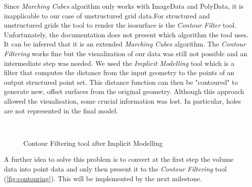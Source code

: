 Since \textit{Marching Cubes} algorithm only works with ImageData and PolyData, it is inapplicable to our case of unstructured grid data.For structured and unstructured grids the tool to render the isosurface is the \textit{Contour Filter} tool. Unfortunately, the documentation does not present which algorithm the tool uses. It
can be inferred that it is an extended \textit{Marching Cubes} algorithm.
The \textit{Contour Filtering} works fine but the visualization of our data was still not possible
and an intermediate step was needed. We used the \textit{Implicit Modelling} tool which is a filter that
computes the distance from the input geometry to the points of an output structured point set.
This distance function can then be "contoured" to generate new, offset surfaces from the original
geometry. Although this approach allowed the visualisation, some crucial information was lost. In particular, holes are not represented in the final model.  

\begin{figure}
\centering
   \\
   \caption{Contour Filtering tool after Implicit Modelling}
   \label{fig:contouring}
\end{figure}

A further idea to solve this problem is to convert at the first step the volume data into point data
and only then present it to the \textit{Contour Filtering} tool (\autoref{fig:contouring}). This will be implemented by the next
milestone.


